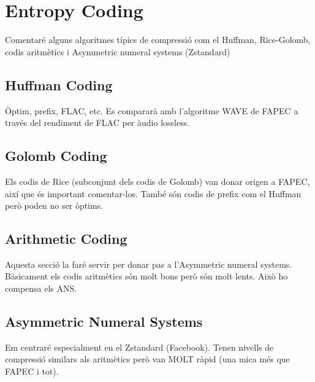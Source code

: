 \chapter{Entropy Coding}
Comentaré alguns algoritmes típics de compressió com el Huffman, Rice-Golomb, codis aritmètics i Asymmetric numeral systems (Zstandard)


\section{Huffman Coding}
Òptim, prefix, FLAC, etc. Es compararà amb l'algoritme WAVE de FAPEC a través del rendiment de FLAC per àudio lossless.

\section{Golomb Coding}
Els codis de Rice (subconjunt dels codis de Golomb) van donar origen a FAPEC, així que és important comentar-los.
També són codis de prefix com el Huffman però poden no ser òptims.

\section{Arithmetic Coding}
Aquesta secció la faré servir per donar pas a l'Asymmetric numeral systems. Bàsicament els codis aritmètics són molt bons però són molt lents. Això ho compensa els ANS.

\section{Asymmetric Numeral Systems}
Em centraré especialment en el Zstandard (Facebook). Tenen nivells de compressió similars als aritmètics però van MOLT ràpid (una mica més que FAPEC i tot).